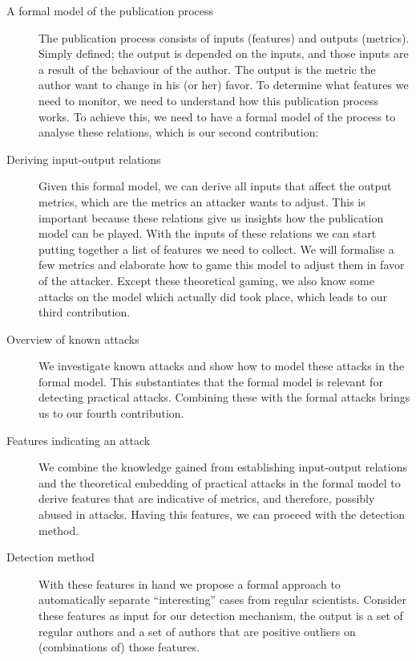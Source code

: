\documentclass{ou-report}
\newcommand{\old}[1]{{\color{gray} #1}}
\begin{document}
\old{
\begin{description}
    \item[A formal model of the publication process] The publication process 
        consists of inputs (features) and outputs (metrics). Simply defined; the 
        output is depended on the inputs, and those inputs are a result of the 
        behaviour of the author. The output is the metric the author want to 
        change in his (or her) favor. To determine what features we need to 
        monitor, we need to understand how this publication process works. To 
        achieve this, we need to have a formal model of the process to analyse 
        these relations, which is our second contribution:
    \item[Deriving input-output relations] Given this formal model, we can 
        derive all inputs that affect the output metrics, which are the metrics 
        an attacker wants to adjust. This is important because these relations 
        give us insights how the publication model can be played. With the 
        inputs of these relations we can start putting together a list of 
        features we need to collect. We will formalise a few metrics and 
        elaborate how to game this model to adjust them in favor of the 
        attacker. Except these theoretical gaming, we also know some attacks on 
        the model which actually did took place, which leads to our third 
        contribution.
    \item[Overview of known attacks] We investigate known attacks and show how 
        to model these attacks in the formal model. This substantiates that the 
        formal model is relevant for detecting practical attacks. Combining 
        these with the formal attacks brings us to our fourth contribution.
    \item[Features indicating an attack] We combine the knowledge gained from 
        establishing input-output relations and the theoretical embedding of 
        practical attacks in the formal model to derive features that are 
        indicative of metrics, and therefore, possibly abused in attacks. Having 
        this features, we can proceed with the detection method.
    \item[Detection method] With these features in hand we propose a formal 
        approach to automatically separate ``interesting'' cases from regular 
        scientists. Consider these features as input for our detection 
        mechanism, the output is a set of regular authors and a set of authors 
        that are positive outliers on (combinations of) those features.
\end{description}
}
\end{document}
